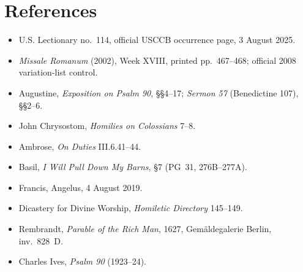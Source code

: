 \section*{References}
\begin{itemize}
\item U.S. Lectionary no.~114, official USCCB occurrence page, 3 August 2025.
\item \emph{Missale Romanum} (2002), Week XVIII, printed pp.~467--468; official
2008 variation-list control.
\item Augustine, \emph{Exposition on Psalm 90}, §§4--17; \emph{Sermon 57}
(Benedictine 107), §§2--6.
\item John Chrysostom, \emph{Homilies on Colossians} 7--8.
\item Ambrose, \emph{On Duties} III.6.41--44.
\item Basil, \emph{I Will Pull Down My Barns}, §7 (PG~31, 276B--277A).
\item Francis, Angelus, 4 August 2019.
\item Dicastery for Divine Worship, \emph{Homiletic Directory} 145--149.
\item Rembrandt, \emph{Parable of the Rich Man}, 1627, Gemäldegalerie Berlin, inv.~828~D.
\item Charles Ives, \emph{Psalm 90} (1923--24).
\end{itemize}
